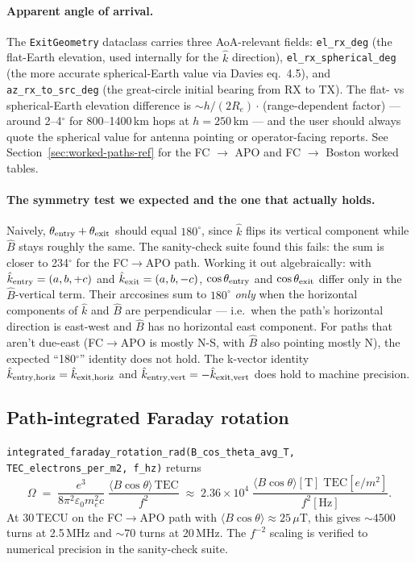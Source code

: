 \documentclass[11pt]{article}
\begin{document}
\paragraph{Apparent angle of arrival.}  The
\texttt{ExitGeometry} dataclass carries three AoA-relevant fields:
\texttt{el\_rx\_deg} (the flat-Earth elevation, used internally for
the $\hat k$ direction), \texttt{el\_rx\_spherical\_deg} (the more
accurate spherical-Earth value via Davies eq.\ 4.5), and
\texttt{az\_rx\_to\_src\_deg} (the great-circle initial bearing
from RX to TX).  The flat- vs spherical-Earth elevation difference
is $\sim h/(2R_e) \cdot $\,(range-dependent factor) — around
2--4$^\circ$ for 800--1400\,km hops at $h = 250$\,km — and the user
should always quote the spherical value for antenna pointing or
operator-facing reports.  See Section~\ref{sec:worked-paths-ref} for
the FC $\to$ APO and FC $\to$ Boston worked tables.

\paragraph{The symmetry test we expected and the one that actually
holds.}  Naively, $\theta_{\rm entry} + \theta_{\rm exit}$ should equal
$180^\circ$, since $\hat k$ flips its vertical component while $\hat B$
stays roughly the same.  The sanity-check suite found this fails: the
sum is closer to 234$^\circ$ for the FC$\to$APO path.  Working it out
algebraically: with $\hat k_{\rm entry} = (a, b, +c)$ and
$\hat k_{\rm exit} = (a, b, -c)$, $\cos\theta_{\rm entry}$ and
$\cos\theta_{\rm exit}$ differ only in the $\hat B$-vertical term.
Their arccosines sum to $180^\circ$ \emph{only} when the horizontal
components of $\hat k$ and $\hat B$ are perpendicular ---
i.e.\ when the path's horizontal direction is east-west and $\hat B$
has no horizontal east component.  For paths that aren't due-east
(FC$\to$APO is mostly N-S, with $\hat B$ also pointing mostly N), the
expected ``180$^\circ$'' identity does not hold.  The k-vector
identity $\hat k_{\rm entry,horiz} = \hat k_{\rm exit,horiz}$ and
$\hat k_{\rm entry,vert} = -\hat k_{\rm exit,vert}$ does hold to
machine precision.

\subsection{Path-integrated Faraday rotation}

\texttt{integrated\_faraday\_rotation\_rad(B\_cos\_theta\_avg\_T,
TEC\_electrons\_per\_m2, f\_hz)} returns
\begin{equation}
\Omega \;=\; \frac{e^3}{8\pi^2\varepsilon_0 m_e^2 c}\;
        \frac{\langle B\cos\theta\rangle\,\mathrm{TEC}}{f^2}
        \;\approx\; 2.36 \times 10^4
        \;\frac{\langle B\cos\theta\rangle[\mathrm{T}]\;\mathrm{TEC}[e/m^2]}{f^2[\mathrm{Hz}]}.
\end{equation}
At 30\,TECU on the FC$\to$APO path with
$\langle B\cos\theta\rangle \approx 25\,\mu$T, this gives $\sim 4500$
turns at 2.5\,MHz and $\sim 70$ turns at 20\,MHz.  The $f^{-2}$ scaling
is verified to numerical precision in the sanity-check suite.
\end{document}

